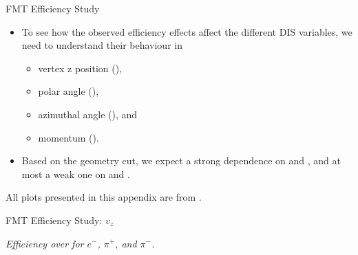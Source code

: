 \begin{frame}{FMT Efficiency Study}
    \label{20.10::fmt_efficiency_study}
    \begin{itemize}
        \item
            To see how the observed efficiency effects affect the different DIS variables, we need to understand their behaviour in

            \vspace{6pt}
            \begin{itemize}
                \item
                    vertex z position (),

                \item
                    polar angle (\ef{$\theta$}),

                \item
                    azimuthal angle (\ef{$\varphi$}), and

                \item
                    momentum ().
            \end{itemize}

        \vspace{12pt}
        \item
            Based on the geometry cut, we expect a strong dependence on  and \ef{$\theta$}, and at most a weak one on \ef{$\varphi$} and .
    \end{itemize}

    \vspace{12pt}
    \ef{*}All plots presented in this appendix are from .

\end{frame}

\begin{frame}{FMT Efficiency Study: $v_z$}
    \begin{center}
        \vspace{-6pt}
        \begin{figure}[t]
        \end{figure}
        \scriptsize{\textit{Efficiency over  for $e^-$, $\pi^+$, and $\pi^-$.}}
    \end{center}

\end{frame}

